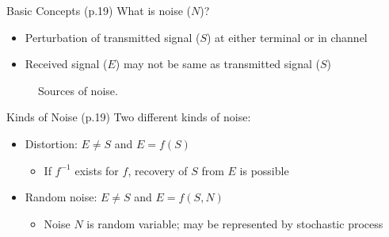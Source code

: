 \documentclass{beamer}
\begin{document}
  \begin{frame}{Basic Concepts \small (p.19)}
    What is noise ($N$)?
    \begin{itemize}
      \item Perturbation of transmitted signal ($S$) at either terminal or in
      channel
      \item Received signal ($E$) may not be same as transmitted signal ($S$)
    \end{itemize}

    \begin{figure}
      \footnotesize
      \caption{Sources of noise.}
    \end{figure}
  \end{frame}

  \begin{frame}{Kinds of Noise \small (p.19)}
    Two different kinds of noise:
    \begin{itemize}
      \item Distortion: $E \neq S$ and $E = f(S)$
      \begin{itemize}
        \item If $f^{-1}$ exists for $f$, recovery of $S$ from $E$ is possible
      \end{itemize}
      \item Random noise: $E \neq S$ and $E = f(S, N)$
      \begin{itemize}
        \item Noise $N$ is random variable; may be represented by stochastic
        process
      \end{itemize}
    \end{itemize}
  \end{frame}
\end{document}
